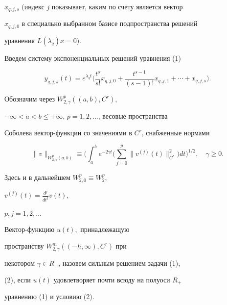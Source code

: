 $x_{q,j,s}$ (индекс $j$ показывает, каким по счету является вектор


$x_{q,j,0}$ в специально выбранном базисе подпространства решений


уравнения $L(\lambda_q)x=0$).


\pagebreak





Введем систему экспоненциальных решений уравнения (1)


\begin{equation}


\label{x}


y_{q,j,s}(t)=e^{\lambda_q t}\bigg(\frac{t^s}{s!}x_{q,j,0}+


\frac{t^{s-1}}{(s-1)!}


x_{q,j,1}+\dotsb+x_{q,j,s}\bigg).


\end{equation}





Обозначим через $W_{2,\gamma}^p((a,b),C^r)$,


$-\infty<a<b\le+\infty$, $p=1,2, \dotsc$, весовые пространства


Соболева вектор-функции со значениями в $C^r$, снабженные нормами


$$


\|v\|_{W_{2,\gamma}^p(a,b)}\equiv\bigg(\int_a^be^{-2\gamma t}\bigg(\sum\limits


_{j=0}^p\|v^{(j)}(t)\|_{C^r}^2\bigg)dt\bigg)^{1/2},\quad \gamma\ge0.


$$


Здесь и в дальнейшем $W_{2,0}^p\equiv W_2^p$,


$v^{(j)}(t)=\frac{d^j}{dt^j}v(t)$,


$p,j=1,2,\dotsc$





\begin{defnnonum}


Вектор-функцию $u(t),$ принадлежащую


пространству $W_{2,\gamma}^m((-h,\infty),C^r)$ при


некотором $\gamma\in R_+$, назовем сильным решением задачи (1),


(2), если $u(t)$ удовлетворяет почти всюду на полуоси $R_+$


уравнению (1) и условию (2).


\end{defnnonum}





